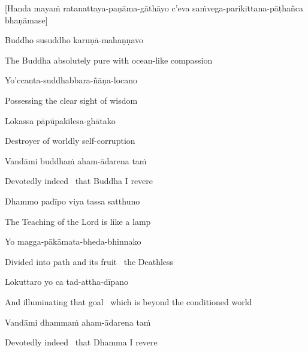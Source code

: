 \begin{center}
  [Handa mayaṁ ratanattaya-paṇāma-gāthāyo c'eva saṁvega-parikittana-pāṭhañca bhaṇāmase]
\end{center}

Buddho susuddho karuṇā-mahaṇṇavo

\begin{english}
  The Buddha absolutely pure with ocean-like compassion
\end{english}

Yo'ccanta-suddhabbara-ñāṇa-locano

\begin{english}
  Possessing the clear sight of wisdom
\end{english}

Lokassa pāpūpakilesa-ghātako

\begin{english}
  Destroyer of worldly self-corruption
\end{english}

Vandāmi buddhaṁ aham-ādarena taṁ

\begin{english}
  Devotedly indeed \breathmark\ that Buddha I revere
\end{english}

Dhammo padīpo viya tassa satthuno

\begin{english}
  The Teaching of the Lord is like a lamp
\end{english}

Yo magga-pākāmata-bheda-bhinnako

\begin{english}
  Divided into path and its fruit \breathmark\ the Deathless
\end{english}

Lokuttaro yo ca tad-attha-dīpano

\begin{english}
  And illuminating that goal \breathmark\ which is beyond the conditioned world
\end{english}

Vandāmi dhammaṁ aham-ādarena taṁ

\begin{english}
  Devotedly indeed \breathmark\ that Dhamma I revere
\end{english}

